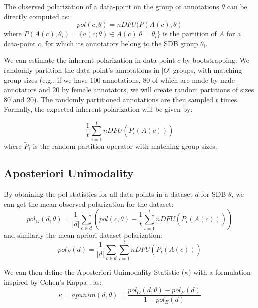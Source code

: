 \documentclass{article}
\begin{document}
The observed polarization of a data-point on the group of annotations $\theta$ can be directly computed as: 
 \begin{equation}
 	pol(c, \theta) = nDFU(P(A(c), \theta)
 \end{equation}
 \noindent where $P(A(c), \theta_i) = \{a(c; \theta) \in A(c) | \theta=\theta_i\}$ is the partition of $A$ for a data-point $c$, for which its annotators belong to the \ac{SDB} group $\theta_i$.
 
 We can estimate the inherent polarization in data-point $c$ by bootstrapping. We randomly partition the data-point's annotations in $\lvert \Theta \rvert$ groups, with matching group sizes (e.g., if we have $100$ annotations, $80$ of which are made by male annotators and $20$ by female annotators, we will create random partitions of sizes $80$ and $20$). The randomly partitioned annotations are then sampled $t$ times. Formally, the expected inherent polarization will be given by:
 
 \begin{equation}
 	\label{eq:pol_expected}
 	\frac{1}{t} \sum_{i=1}^t  \textit{nDFU}(\tilde{P}_i(A(c)))
 \end{equation}
 \noindent where $\tilde{P}_i$ is the random partition operator with matching group sizes.


\subsection{Aposteriori Unimodality}
\label{ssec:methodology:aposteriori}

By obtaining the pol-statistics for all data-points in a dataset $d$ for \ac{SDB} $\theta$, we can get the mean observed polarization for the dataset:
\begin{equation}
	pol_{O}(d, \theta) = \frac{1}{\lvert d \rvert} \sum_{c \in d} (pol(c, \theta) - \frac{1}{t} \sum_{i=1}^t  \textit{nDFU}(\tilde{P}_i(A(c))))
\end{equation} 
\noindent and similarly the mean apriori dataset polarization:
\begin{equation}
	pol_{E}(d) = \frac{1}{\lvert d \rvert} \sum_{c \in d} \sum_{i=1}^t  \textit{nDFU}(\tilde{P}_i(A(c)))
\end{equation}

\noindent We can then define the Aposteriori Unimodality Statistic ($\kappa$) with a formulation inspired by Cohen's Kappa \cite{Cohen_1960}, as:
\begin{equation}
	\kappa = apunim(d, \theta) = \frac{pol_O(d, \theta) - pol_E(d)}{1 - pol_E(d)}
\end{equation}
\end{document}
